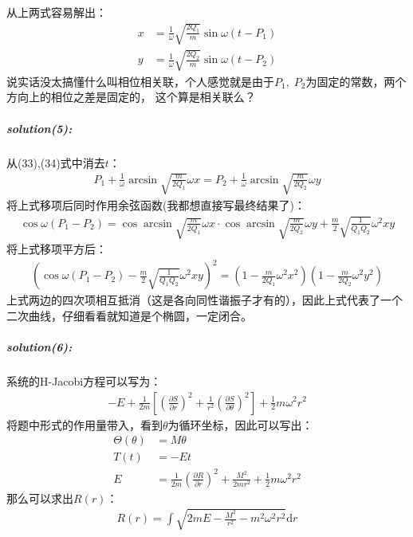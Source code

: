 \documentclass[a4paper]{ctexart}
\def\d{\mathrm{d}}
\begin{document}
    从上两式容易解出：
    \begin{align}
        x &= \frac{1}{\omega}\sqrt{\frac{2Q_{1}}{m}}\sin\omega(t-P_{1})\\
        y &= \frac{1}{\omega}\sqrt{\frac{2Q_{2}}{m}}\sin\omega(t-P_{2})
    \end{align}
    说实话没太搞懂什么叫相位相关联，个人感觉就是由于$P_{1},\;P_{2}$为固定的常数，两个方向上的相位之差是固定的，
    这个算是相关联么？
    \subparagraph{solution(5):}
    从(33),(34)式中消去$t$：
    \begin{align}
        P_{1} + \frac{1}{\omega}\arcsin\sqrt{\frac{m}{2Q_{1}}}\omega x = P_{2} + \frac{1}{\omega}\arcsin\sqrt{\frac{m}{2Q_{2}}}\omega y
    \end{align}
    将上式移项后同时作用余弦函数(我都想直接写最终结果了)：
    \begin{align}
        \cos\omega(P_{1} - P_{2}) = \cos\arcsin\sqrt{\frac{m}{2Q_{1}}}\omega x\cdot\cos\arcsin\sqrt{\frac{m}{2Q_{2}}}\omega y + \frac{m}{2}\sqrt{\frac{1}{Q_{1}Q_{2}}}\omega^{2}xy
    \end{align}
    将上式移项平方后：
    \begin{align}
        \left(\cos\omega(P_{1}-P_{2}) - \frac{m}{2}\sqrt{\frac{1}{Q_{1}Q_{2}}}\omega^{2}xy\right)^{2} = 
        \left(1 - \frac{m}{2Q_{1}}\omega^{2}x^{2}\right)\left(1-\frac{m}{2Q_{2}}\omega^{2}y^{2}\right)
    \end{align}
    上式两边的四次项相互抵消（这是各向同性谐振子才有的），因此上式代表了一个二次曲线，仔细看看就知道是个椭圆，一定闭合。
    \subparagraph{solution(6):}
    系统的H-Jacobi方程可以写为：
    \begin{align}
        -E  + \frac{1}{2m}\left[\left(\frac{\partial S}{\partial r}\right)^{2} + \frac{1}{r^{2}}\left(\frac{\partial S}{\partial \theta}\right)^{2}\right] + \frac{1}{2}m\omega^{2}r^{2}
    \end{align}
    将题中形式的作用量带入，看到$\theta$为循环坐标，因此可以写出：
    \begin{align}
        \Theta(\theta) &= M\theta\\
        T(t) &= -Et\\
        E &= \frac{1}{2m}\left(\frac{\partial R}{\partial r}\right)^{2} + \frac{M^{2}}{2mr^{2}} + \frac{1}{2}m\omega^{2}r^{2}
    \end{align}
    那么可以求出$R(r)$：
    \begin{align}
        R(r) = \int\sqrt{2mE - \frac{M^{2}}{r^{2}} - m^{2}\omega^{2}r^{2}}\d r
    \end{align}
\end{document}
